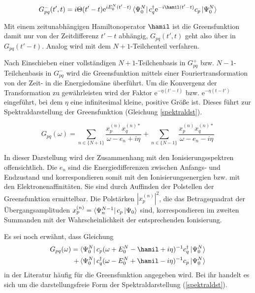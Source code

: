 \begin{equation}\label{g-hsb}
G_{pq}^-(t',t) = i\Theta(t'-t) \mathrm{e}^{iE_0^N(t'-t)}\bra{\Psi_0^N}c_q^\dagger\mathrm{e}^{-i\hamil(t'-t)}c_p\ket{\Psi_0^N}
\end{equation}

Mit einem zeitunabhängigen Hamiltonoperator $\hamil$ ist die Greensfunktion damit nur von der Zeitdifferenz $t'-t$ abhängig, $G_{pq}(t',t)$ geht also über in $G_{pq}(t'-t)$. Analog wird mit dem $N+1$-Teilchenteil verfahren.

Nach Einschieben einer vollständigen $N+1$-Teilchenbasis in $G_{pq}^+$ bzw. $N-1$-Teilchenbasis in $G_{pq}^-$ wird die Greensfunktion mittels einer Fouriertransformation von der Zeit- in die Energiedomäne überführt. Um die Konvergenz der Transformation zu gewährleisten wird der Faktor $\mathrm{e}^{-\eta(t'-t)}$ bzw. $\mathrm{e}^{-\eta(t-t')}$ eingeführt, bei dem $\eta$ eine infinitesimal kleine, positive Größe ist. Dieses führt zur Spektraldarstellung der Greensfunktion (Gleichung \ref{spektraldst}).

\begin{equation}\label{spektraldst}
G_{pq}(\omega) = \sum\limits_{n\in\{N+1\}}\frac{x_p^{(n)}x_q^{(n)*}}{\omega-e_n +i\eta} + \sum\limits_{n\in\{N-1\}}\frac{x_p^{(n)}x_q^{(n)*}}{\omega-e_n -i\eta}
\end{equation}

In dieser Darstellung wird der Zusammenhang mit den Ionisierungsspektren offensichtlich.  Die $e_n$ sind die Energiedifferenzen zwischen Anfangs- und Endzustand und korrespondieren somit mit den Ionisierungsenergien bzw. mit den Elektronenaffinitäten. Sie sind durch Auffinden der Polstellen der Greensfunktion ermittelbar. Die Polstärken $\left|x_p^{(n)}\right|^2$, die das Betragsquadrat der Übergangsamplituden $x_p^{(n)}=\bra{\Psi_n^{N-1}}c_p\ket{\Psi_0}$ sind, korrespondieren im zweiten Summanden mit der Wahrscheinlichkeit der entsprechenden Ionisierung.


Es sei noch erwähnt, dass Gleichung
\begin{equation}\label{fourier}
\begin{split}
G_{pq}(\omega) = \bra{\Psi_0^N}c_p(\omega+E_0^N-\hamil+i\eta)^{-1}c_q^\dagger\ket{\Psi_0^N} \\+ \bra{\Psi_0^N}c_q^\dagger(\omega-E_0^N+\hamil-i\eta)^{-1}c_p\ket{\Psi_0^N}
\end{split}
\end{equation}
in der Literatur häufig für die Greensfunktion angegeben wird. Bei ihr handelt es sich um die darstellungsfreie Form der Spektraldarstellung (\ref{spektraldst}).


